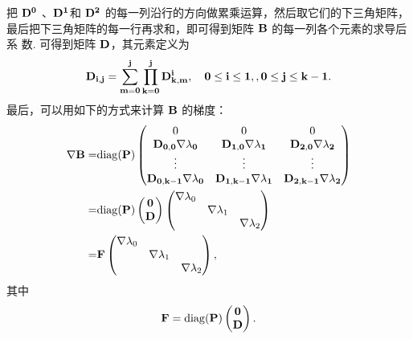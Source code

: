 \documentclass[12pt,a4paper]{article}
\begin{document}
把 $\bf D^0$ 、$\bf D^1$和 $\bf D^2$ 的每一列沿行的方向做累乘运算，然后取它们的下三角矩阵，
最后把下三角矩阵的每一行再求和，即可得到矩阵 $\bf B$ 的每一列各个元素的求导后系
数. 可得到矩阵 $\bf D$，其元素定义为 
$$
\bf D_{i,j} = \sum_{m=0}^j\prod_{k=0}^j D^i_{k, m},\quad 0 \le i \le 1,
, 0 \le j \le k-1.
$$
最后，可以用如下的方式来计算 $\bf B$ 的梯度：
\begin{equation*}
	\begin{aligned}
		\nabla \bf B = & \mathrm{diag}(\bf P)
		\begin{pmatrix}
			0 & 0 & 0 \\
			\bf D_{0,0} \nabla \lambda_0 & 
			\bf D_{1,0} \nabla \lambda_1 & 
			\bf D_{2,0} \nabla \lambda_2 \\
			\vdots & \vdots& \vdots\\
			\bf D_{0, k-1} \nabla \lambda_0 &
			\bf D_{1, k-1} \nabla \lambda_1 &
			\bf D_{2, k-1} \nabla \lambda_2
		\end{pmatrix}\\
		= & \mathrm{diag}(\bf P)
		\begin{pmatrix}
			\mathbf 0\\
			\bf D
		\end{pmatrix}
		\begin{pmatrix}
			\nabla \lambda_0 \\
			& \nabla \lambda_1 \\
			&& \nabla \lambda_2
		\end{pmatrix}\\
		= & \bf F 
		\begin{pmatrix}
			\nabla \lambda_0 &  \\
			& \nabla \lambda_1 \\
			&& \nabla \lambda_2
		\end{pmatrix},
	\end{aligned}
\end{equation*}
其中
\begin{equation}\label{eq:F}
\bf F = \mathrm{diag}(\bf P)
\begin{pmatrix} 
\mathbf 0\\ \bf D
\end{pmatrix}.
\end{equation}
\end{document}
